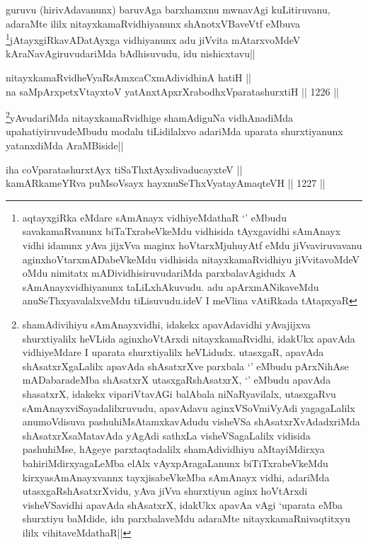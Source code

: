 \begin{artha}
guruvu (hirivAdavanunx) baruvAga barxhamxnu mwnavAgi kuLitiruvanu, adaraMte ililx nitayxkamaRvidhiyanunx shAnotxVBaveVtf eMbuva \footnote{aqtayxgiRka eMdare sAmAnayx vidhiyeMdathaR `\stext' eMbudu savakamaRvanunx biTaTxrabeVkeMdu vidhisida tAyxgavidhi sAmAnayx vidhi idanunx yAva jijxVva maginx hoVtarxMjuhuyAtf eMdu jiVvaviruvavanu aginxhoVtarxmADabeVkeMdu vidhisida nitayxkamaRvidhiyu jiVvitavoMdeV oMdu nimitatx mADividhisiruvudariMda parxbalavAgidudx A sAmAnayxvidhiyanunx taLiLxhAkuvudu. adu apArxmANikaveMdu anuSeThxyavalalxveMdu tiLisuvudu.ideV I meVlina vAtiRkada tAtapxyaR}jAtayxgiRkavADatAyxga vidhiyanunx adu jiVvita mAtarxvoMdeV kAraNavAgiruvudariMda bAdhisuvudu, idu nishicxtavu||
\end{artha}

\begin{shl}
nitayxkamaRvidheVyaRsAmxcaCxmAdividhinA hatiH || \\
na saMpArxpetxVtayxtoV yatAnxtApxrXrabodhxVparatashurxtiH ||  1226 ||  
\end{shl}

\begin{artha}
\footnote{shamAdivihiyu sAmAnayxvidhi, idakekx apavAdavidhi yAvajijxva shurxtiyalilx heVLida aginxhoVtArxdi nitayxkamaRvidhi, idakUkx apavAda vidhiyeMdare I uparata shurxtiyalilx heVLidudx. utasxgaR, apavAda shAsatxrXgaLalilx apavAda shAsatxrXve parxbala `\stext' eMbudu pArxNihAse mADabaradeMba shAsatxrX utasxgaRshAsatxrX, `\stext'  eMbudu apavAda shasatxrX, idakekx vipariVtavAGi balAbala niNaRyavilalx, utasxgaRvu sAmAnayxviSayadalilxruvudu, apavAdavu aginxVSoVmiVyAdi yagagaLalilx anumoVdisuva pashuhiMsAtamxkavAdudu visheVSa shAsatxrXvAdadxriMda shAsatxrXsaMatavAda yAgAdi sathxLa visheVSagaLalilx vidisida pashuhiMse, hAgeye parxtaqtadalilx shamAdividhiyu aMtayiMdirxya bahiriMdirxyagaLeMba elAlx vAyxpAragaLanunx biTiTxrabeVkeMdu kirxyasAmAnayxvannx tayxjisabeVkeMba sAmAnayx vidhi, adariMda utasxgaRshAsatxrXvidu, yAva jiVva shurxtiyun aginx hoVtArxdi visheVSavidhi apavAda shAsatxrX, idakUkx apavAa vAgi `uparata eMba shurxtiyu baMdide, idu parxbalaveMdu adaraMte nitayxkamaRnivaqtitxyu  ililx vihitaveMdathaR||}yAvudariMda nitayxkamaRvidhige shamAdiguNa vidhAnadiMda upahatiyiruvudeMbudu modalu tiLidilalxvo adariMda uparata shurxtiyanunx yatanxdiMda AraMBiside||
\end{artha}

\begin{shl}
iha coVparatashurxtAyx tiSaThxtAyxdivaducayxteV || \\
kamARkameYRva puMsoV\s sayx hayxnuSeThxVyatayA\s \s maqteVH ||  1227 ||  
\end{shl}

